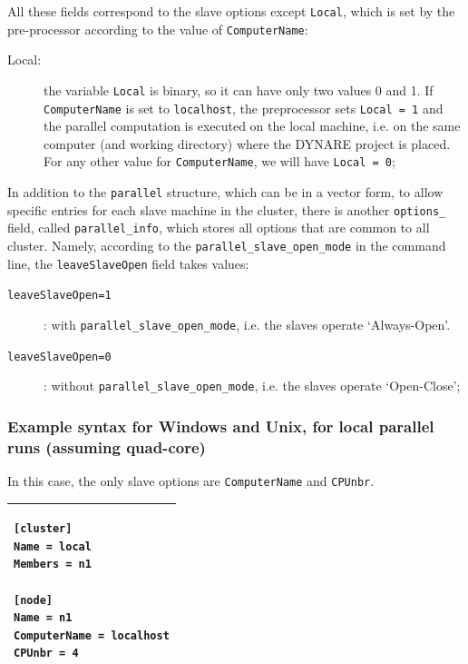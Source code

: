 \documentclass[12pt,a4paper,pdftex]{article}
\begin{document}
All these fields correspond to the slave options except \verb"Local", which is set by the pre-processor according to the value of \verb"ComputerName":
\begin{description}
\item[Local:] the variable \verb"Local" is binary, so it can have only two values 0 and 1. If \verb"ComputerName" is set to \verb"localhost", the preprocessor sets \verb"Local = 1" and the parallel computation is executed on the local machine, i.e. on the same computer (and working directory) where the DYNARE project is placed. For any other value for \verb"ComputerName", we will have \verb"Local = 0";
\end{description}

In addition to the \verb"parallel" structure, which can be in a vector form, to allow specific entries for each slave machine in the cluster, there is another \verb"options_" field, called \verb"parallel_info", which stores all options that are common to all cluster. Namely, according to the \verb"parallel_slave_open_mode" in the command line, the \verb"leaveSlaveOpen" field takes values:
\begin{description}
\item[\texttt{leaveSlaveOpen=1}]: with \verb"parallel_slave_open_mode", i.e. the slaves operate `Always-Open'.
\item[\texttt{leaveSlaveOpen=0}]: without \verb"parallel_slave_open_mode", i.e. the slaves operate `Open-Close';
\end{description}


\subsubsection{Example syntax for Windows and Unix, for local parallel runs (assuming quad-core)}
In this case, the only slave options are \verb"ComputerName" and \verb"CPUnbr".

\singlespacing
{\footnotesize
\hspace{2cm}\begin{tabular}[b]{| p{8cm} |}
  \hline
\begin{verbatim}
[cluster]
Name = local
Members = n1

[node]
Name = n1
ComputerName = localhost
CPUnbr = 4
\end{verbatim}
\\ \hline
\end{tabular}
}
\doublespacing
\end{document}

